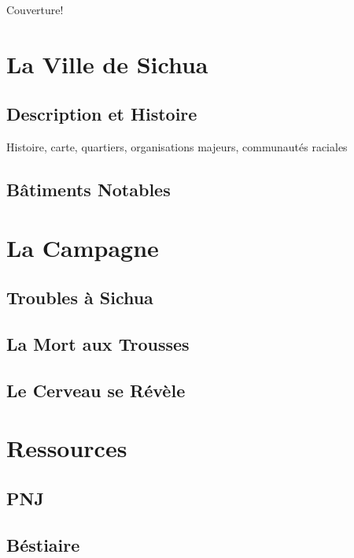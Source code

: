 \documentclass{dd}
\begin{document}
Couverture!

\clearpage

\tableofcontents

\part{La Ville de Sichua}

\chapter{Description et Histoire}

Histoire, carte, quartiers, organisations majeurs, communautés raciales

\chapter{Bâtiments Notables}





\part{La Campagne}

\chapter{Troubles à Sichua}



\chapter{La Mort aux Trousses}

\chapter{Le Cerveau se Révèle}

\part{Ressources}

\chapter{PNJ}

\chapter{Béstiaire}
\end{document}
